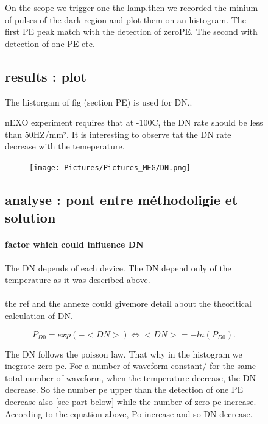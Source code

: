 \documentclass[a4paper, 11pt]{report}%
\begin{document}
\begin{figure}[!hbtp]
  On the scope we trigger one the lamp.then we recorded the minium of pulses of the dark region and plot
  them on an histogram. The first PE peak match with the detection of zeroPE. The second with detection of one PE etc. 
  
  \subsection{results : plot}
  
  The historgam of fig (section PE) is used for DN..
  
  nEXO experiment requires that at -100C, the DN rate should be less than 50HZ/mm². 
  It is interesting to observe tat the DN rate decrease with the temeperature. 
  
  \begin{figure}[!hbtp]
  \centering
  \texttt{[image: Pictures/Pictures\_MEG/DN.png]}
  \label{fig:pulse_shape}
  \end{figure}

  
  \subsection{analyse : pont entre méthodoligie et solution }
  
  \paragraph{factor which could influence DN}
  
  The DN depends of each device. The DN depend only of the temperature as it was described above. 
  
  \paragraph{}
  
  the ref and the annexe could givemore detail about the theoritical calculation of DN. 
  
  \begin{equation}
    P_{D0} =  exp(-<DN>) \iff <DN> = -ln(P_{D0}).
  \end{equation}
  
  The DN follows the poisson law. That why in the histogram we inegrate zero pe. For a number of waveform constant/
  for the same total number of waveform, when the temperature decrease, the DN decrease. So the number pe upper than the detection
  of one PE decrease also \ref{see part below} while the number of zero pe increase. 
  According to the equation above, Po increase and so DN decrease.   
  

\end{figure}
\end{document}
